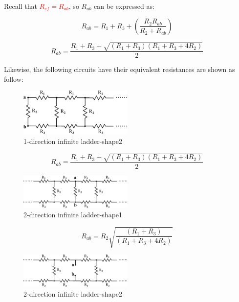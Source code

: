 \documentclass[a4 paper]{article}
\newcommand{\red}[1]{\textcolor{red}{#1}}
\numberwithin{equation}{section}
\newcommand{\0}{\mathbf{0}}
\begin{document}
Recall that \red{$R_{ef} = R_{ab}$}, so $R_{ab}$ can be expressed as:

\begin{equation}
R_{ab} = R_1 + R_3 + (\frac{R_2R_{ab}}{R_2 + R_{ab}})
\end{equation}

\begin{equation}
R_{ab} = \frac{R_1 + R_3 + \sqrt{(R_1 + R_3)(R_1 + R_3 + 4R_2)}}{2}
\end{equation}

Likewise, the following circuits have their equivalent resistances are shown as follow:

\begin{figure}[!ht]
  \caption{1-direction infinite ladder-shape2}
  \label{equ_resisinf1_1}
  \centering
  \includegraphics[width=0.5\textwidth]{./images/equ_resisinf1_1}
\end{figure}

\begin{equation}
R_{ab} = \frac{R_1 + R_3 + \sqrt{(R_1 + R_3)(R_1 + R_3 + 4R_2)}}{2}
\end{equation}

\begin{figure}[!ht]
  \caption{2-direction infinite ladder-shape1}
  \label{equ_resisinf2}
  \centering
  \includegraphics[width=0.5\textwidth]{./images/equ_resisinf2}
\end{figure}

\begin{equation}
R_{ab} = R_2\sqrt{\frac{(R_1 + R_3)}{(R_1 + R_3 + 4R_2)}}
\end{equation}
\vspace{3 cm}


\begin{figure}[!ht]
  \caption{2-direction infinite ladder-shape2}
  \label{equ_resisinf3}
  \centering
  \includegraphics[width=0.5\textwidth]{./images/equ_resisinf3}
\end{figure}
\end{document}
